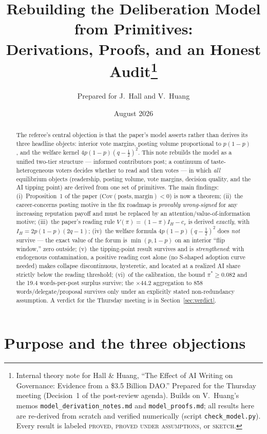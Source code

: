 \documentclass[11pt]{article}
\title{Rebuilding the Deliberation Model from Primitives:\\
Derivations, Proofs, and an Honest Audit\thanks{Internal theory note for
Hall \& Huang, ``The Effect of AI Writing on Governance: Evidence from a
\$3.5 Billion DAO.'' Prepared for the Thursday meeting (Decision~1 of the
post-review agenda). Builds on V.~Huang's memos \texttt{model\_derivation\_notes.md}
and \texttt{model\_proofs.md}; all results here are re-derived from scratch and
verified numerically (script \texttt{check\_model.py}). Every result is labeled
\textsc{proved}, \textsc{proved under assumptions}, or \textsc{sketch}.}}
\author{Prepared for J.~Hall and V.~Huang}
\date{August 2026}
\theoremstyle{remark}
\newcommand{\Cov}{\mathrm{Cov}}
\begin{document}
\maketitle

\begin{abstract}
\noindent The referee's central objection is that the paper's model asserts rather
than derives its three headline objects: interior vote margins, posting volume
proportional to $p(1-p)$, and the welfare kernel $4p(1-p)(q-\tfrac12)^2$. This
note rebuilds the model as a unified two-tier structure --- informed contributors
post; a continuum of taste-heterogeneous voters decides whether to read and then
votes --- in which \emph{all} equilibrium objects (readership, posting volume,
vote margins, decision quality, and the AI tipping point) are derived from one
set of primitives. The main findings: (i)~Proposition~1 of the paper
($\Cov(\text{posts},\text{margin})<0$) is now a theorem; (ii)~the
career-concerns posting motive in the fix roadmap is \emph{provably wrong-signed}
for any increasing reputation payoff and must be replaced by an
attention/value-of-information motive; (iii)~the paper's reading rule
$V(\pi)=(1-\pi)I_H-c_r$ is derived \emph{exactly}, with
$I_H=2p(1-p)(2q-1)$; (iv)~the welfare formula $4p(1-p)(q-\tfrac12)^2$ does
\emph{not} survive --- the exact value of the forum is
$\min(p,1-p)$ on an interior ``flip window,'' zero outside; (v)~the tipping-point
result survives and is \emph{strengthened}: with endogenous contamination, a
positive reading cost alone (no S-shaped adoption curve needed) makes collapse
discontinuous, hysteretic, and located at a realized AI share strictly below the
reading threshold; (vi)~of the calibration, the bound $\pi^*\ge 0.082$ and the
19.4 words-per-post surplus survive; the $\times 44.2$ aggregation to 858
words/delegate/proposal survives only under an explicitly stated
non-redundancy assumption. A verdict for the Thursday meeting is in
Section~\ref{sec:verdict}.
\end{abstract}

\section{Purpose and the three objections}
\label{sec:intro}
\end{document}
